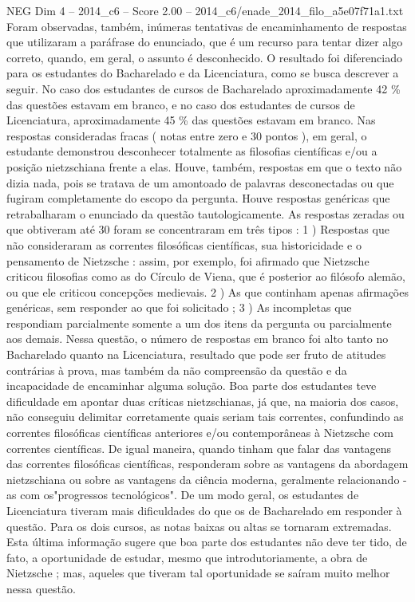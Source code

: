 \begin{textsample}{NEG Dim 4 – 2014\_c6 – Score 2.00 – 2014\_c6/enade\_2014\_filo\_a5e07f71a1.txt}
Foram observadas, também, inúmeras tentativas de encaminhamento de respostas que utilizaram a paráfrase do enunciado, que é um recurso para tentar dizer algo correto, quando, em geral, o assunto é desconhecido.
O resultado foi diferenciado para os estudantes do Bacharelado e da Licenciatura, como se busca descrever a seguir.
No caso dos estudantes de cursos de Bacharelado aproximadamente 42 \% das questões estavam em branco, e no caso dos estudantes de cursos de Licenciatura, aproximadamente 45 \% das questões estavam em branco.
Nas respostas consideradas fracas ( notas entre zero e 30 pontos ), em geral, o estudante demonstrou desconhecer totalmente as filosofias científicas e/ou a posição nietzschiana frente a elas.
Houve, também, respostas em que o texto não dizia nada, pois se tratava de um amontoado de palavras desconectadas ou que fugiram completamente do escopo da pergunta.
Houve respostas genéricas que retrabalharam o enunciado da questão tautologicamente.
As respostas zeradas ou que obtiveram até 30 foram se concentraram em três tipos : 1 ) Respostas que não consideraram as correntes filosóficas científicas, sua historicidade e o pensamento de Nietzsche : assim, por exemplo, foi afirmado que Nietzsche criticou filosofias como as do Círculo de Viena, que é posterior ao filósofo alemão, ou que ele criticou concepções medievais. 2 ) As que continham apenas afirmações genéricas, sem responder ao que foi solicitado ; 3 ) As incompletas que respondiam parcialmente somente a um dos itens da pergunta ou parcialmente aos demais.
Nessa questão, o número de respostas em branco foi alto tanto no Bacharelado quanto na Licenciatura, resultado que pode ser fruto de atitudes contrárias à prova, mas também da não compreensão da questão e da incapacidade de encaminhar alguma solução.
Boa parte dos estudantes teve dificuldade em apontar duas críticas nietzschianas, já que, na maioria dos casos, não conseguiu delimitar corretamente quais seriam tais correntes, confundindo as correntes filosóficas científicas anteriores e/ou contemporâneas à Nietzsche com correntes científicas.
De igual maneira, quando tinham que falar das vantagens das correntes filosóficas científicas, responderam sobre as vantagens da abordagem nietzschiana ou sobre as vantagens da ciência moderna, geralmente relacionando -as com os"progressos tecnológicos".
De um modo geral, os estudantes de Licenciatura tiveram mais dificuldades do que os de Bacharelado em responder à questão.
Para os dois cursos, as notas baixas ou altas se tornaram extremadas.
Esta última informação sugere que boa parte dos estudantes não deve ter tido, de fato, a oportunidade de estudar, mesmo que introdutoriamente, a obra de Nietzsche ; mas, aqueles que tiveram tal oportunidade se saíram muito melhor nessa questão.

\end{textsample}
